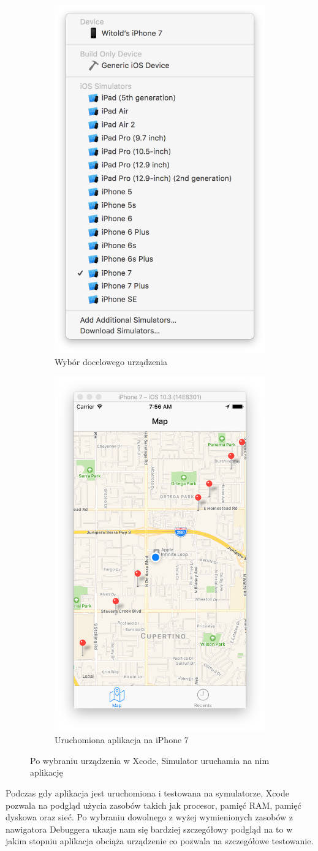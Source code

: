 \begin{figure}[ht!]
\centering
\begin{subfigure}{.5\textwidth}
  \centering
  \includegraphics[width=.4\linewidth]{images/chapter-2-image-3-target.png}
  \caption{Wybór docelowego urządzenia}
  \label{chapter-2-image-3-target}
\end{subfigure}%
\begin{subfigure}{.5\textwidth}
  \centering
  \includegraphics[width=.4\linewidth]{images/chapter-2-image-4-simulator.png}
  \caption{Uruchomiona aplikacja na iPhone 7}
  \label{chapter-2-image-4-simulator}
\end{subfigure}
\caption{Po wybraniu urządzenia w Xcode, Simulator uruchamia na nim aplikację}
\label{chapter-2-image-4-5}
\end{figure}

Podczas gdy aplikacja jest uruchomiona i testowana na symulatorze, Xcode pozwala na podgląd użycia zasobów takich jak procesor, pamięć RAM, pamięć dyskowa oraz sieć. Po wybraniu dowolnego z wyżej wymienionych zasobów z nawigatora Debuggera ukazje nam się bardziej szczegółowy podgląd na to w jakim stopniu aplikacja obciąża urządzenie co pozwala na szczegółowe testowanie.

